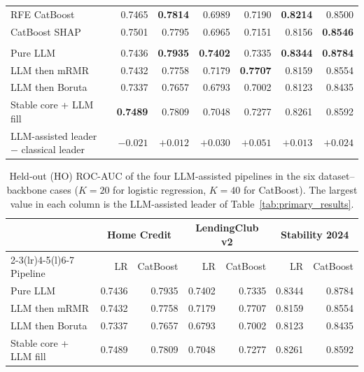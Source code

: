 \documentclass[final,5p,twocolumn]{elsarticle}
\newcommand{\Kfeat}{K}
\begin{document}
\begin{table}[htbp]
\begin{threeparttable}
\begin{tabular}{@{}lrrrrrr@{}}
RFE CatBoost & 0.7465 & \textbf{0.7814} & 0.6989 & 0.7190 & \textbf{0.8214} & 0.8500 \\
CatBoost SHAP & 0.7501 & 0.7795 & 0.6965 & 0.7151 & 0.8156 & \textbf{0.8546} \\
\addlinespace
\multicolumn{7}{@{}l}{\emph{LLM-assisted family (four pipelines)}} \\
Pure LLM & 0.7436 & \textbf{0.7935} & \textbf{0.7402} & 0.7335 & \textbf{0.8344} & \textbf{0.8784} \\
LLM then mRMR & 0.7432 & 0.7758 & 0.7179 & \textbf{0.7707} & 0.8159 & 0.8554 \\
LLM then Boruta & 0.7337 & 0.7657 & 0.6793 & 0.7002 & 0.8123 & 0.8435 \\
Stable core + LLM fill & \textbf{0.7489} & 0.7809 & 0.7048 & 0.7277 & 0.8261 & 0.8592 \\
\midrule
LLM-assisted leader $-$ classical leader & $-0.021$ & $+0.012$ & $+0.030$ & $+0.051$ & $+0.013$ & $+0.024$ \\
\bottomrule
\end{tabular}
\end{threeparttable}
\end{table}

\begin{table}[htbp]
\centering
\footnotesize
\caption{Held-out (HO) ROC-AUC of the four LLM-assisted pipelines in the six dataset--backbone cases ($\Kfeat=20$ for logistic regression, $\Kfeat=40$ for CatBoost). The largest value in each column is the LLM-assisted leader of Table~\ref{tab:primary_results}.}
\label{tab:llm_pipelines}
\setlength{\tabcolsep}{5pt}
\begin{tabular}{@{}lrrrrrr@{}}
\toprule
 & \multicolumn{2}{c}{Home Credit} & \multicolumn{2}{c}{LendingClub v2} & \multicolumn{2}{c}{Stability 2024} \\
\cmidrule(lr){2-3}\cmidrule(lr){4-5}\cmidrule(l){6-7}
Pipeline & LR & CatBoost & LR & CatBoost & LR & CatBoost \\
\midrule
Pure LLM & 0.7436 & 0.7935 & 0.7402 & 0.7335 & 0.8344 & 0.8784 \\
LLM then mRMR & 0.7432 & 0.7758 & 0.7179 & 0.7707 & 0.8159 & 0.8554 \\
LLM then Boruta & 0.7337 & 0.7657 & 0.6793 & 0.7002 & 0.8123 & 0.8435 \\
Stable core + LLM fill & 0.7489 & 0.7809 & 0.7048 & 0.7277 & 0.8261 & 0.8592 \\
\bottomrule
\end{tabular}
\end{table}
\end{document}
